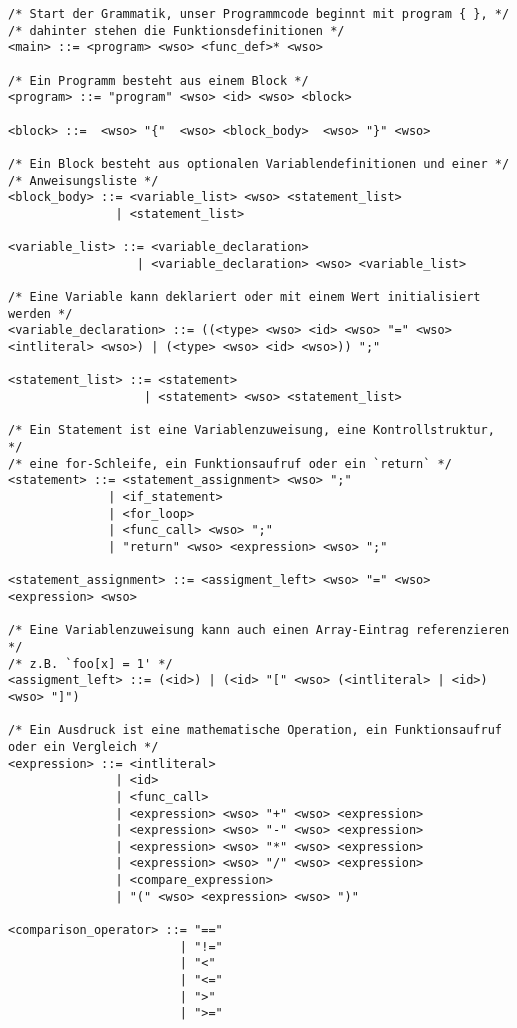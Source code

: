 \begin{lstlisting}
/* Start der Grammatik, unser Programmcode beginnt mit program { }, */
/* dahinter stehen die Funktionsdefinitionen */
<main> ::= <program> <wso> <func_def>* <wso>

/* Ein Programm besteht aus einem Block */
<program> ::= "program" <wso> <id> <wso> <block>

<block> ::=  <wso> "{"  <wso> <block_body>  <wso> "}" <wso>

/* Ein Block besteht aus optionalen Variablendefinitionen und einer */ 
/* Anweisungsliste */
<block_body> ::= <variable_list> <wso> <statement_list>
               | <statement_list>

<variable_list> ::= <variable_declaration>
                  | <variable_declaration> <wso> <variable_list>

/* Eine Variable kann deklariert oder mit einem Wert initialisiert werden */
<variable_declaration> ::= ((<type> <wso> <id> <wso> "=" <wso> <intliteral> <wso>) | (<type> <wso> <id> <wso>)) ";"

<statement_list> ::= <statement>
                   | <statement> <wso> <statement_list>

/* Ein Statement ist eine Variablenzuweisung, eine Kontrollstruktur, */
/* eine for-Schleife, ein Funktionsaufruf oder ein `return` */
<statement> ::= <statement_assignment> <wso> ";"
              | <if_statement>
              | <for_loop>
              | <func_call> <wso> ";"
              | "return" <wso> <expression> <wso> ";"

<statement_assignment> ::= <assigment_left> <wso> "=" <wso> <expression> <wso>

/* Eine Variablenzuweisung kann auch einen Array-Eintrag referenzieren */
/* z.B. `foo[x] = 1' */
<assigment_left> ::= (<id>) | (<id> "[" <wso> (<intliteral> | <id>) <wso> "]")

/* Ein Ausdruck ist eine mathematische Operation, ein Funktionsaufruf oder ein Vergleich */
<expression> ::= <intliteral>
               | <id>
               | <func_call>
               | <expression> <wso> "+" <wso> <expression>
               | <expression> <wso> "-" <wso> <expression>
               | <expression> <wso> "*" <wso> <expression>
               | <expression> <wso> "/" <wso> <expression>
               | <compare_expression>
               | "(" <wso> <expression> <wso> ")"

<comparison_operator> ::= "=="
                        | "!="
                        | "<"
                        | "<="
                        | ">"
                        | ">="


\end{lstlisting}
